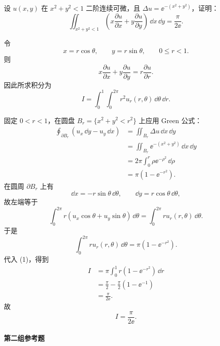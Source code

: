 \begin{xreferenceproblem}[7]
设 $u(x,y)$ 在 $x^2+y^2<1$ 二阶连续可微，且 $\Delta u=\ee^{-(x^2+y^2)}$，证明：
\[
  \iint_{x^2+y^2<1}\left(x\frac{\partial u}{\partial x}+y\frac{\partial u}{\partial y}\right)\,\dd x\,\dd y
  =\frac{\pi}{2\ee}.
\]
\end{xreferenceproblem}
\begin{xsolution}
令
\[
  x=r\cos\theta,
  \qquad
  y=r\sin\theta,
  \qquad
  0\le r<1.
\]
则
\[
  x\frac{\partial u}{\partial x}
  +y\frac{\partial u}{\partial y}
  =r\frac{\partial u}{\partial r}.
\]
因此所求积分为
\begin{equation}
  I=\int_0^1\int_0^{2\pi}r^2u_r(r,\theta)\,\dd\theta\,\dd r.
  \tag{1}
\end{equation}

固定 $0<r<1$，在圆盘 $B_r=\{x^2+y^2<r^2\}$ 上应用 Green 公式：
\begin{align*}
  \oint_{\partial B_r}
  \left(u_x\,\dd y-u_y\,\dd x\right)
  &=\iint_{B_r}\Delta u\,\dd x\,\dd y\\
  &=\iint_{B_r}\ee^{-(x^2+y^2)}\,\dd x\,\dd y\\
  &=2\pi\int_0^r\rho\ee^{-\rho^2}\,\dd\rho\\
  &=\pi(1-\ee^{-r^2}).
\end{align*}
在圆周 $\partial B_r$ 上有
\[
  \dd x=-r\sin\theta\,\dd\theta,
  \qquad
  \dd y=r\cos\theta\,\dd\theta,
\]
故左端等于
\[
  \int_0^{2\pi}r
  \left(u_x\cos\theta+u_y\sin\theta\right)\,\dd\theta
  =\int_0^{2\pi}r u_r(r,\theta)\,\dd\theta.
\]
于是
\[
  \int_0^{2\pi}r u_r(r,\theta)\,\dd\theta
  =\pi(1-\ee^{-r^2}).
\]
代入 (1)，得到
\begin{align*}
  I
  &=\pi\int_0^1 r(1-\ee^{-r^2})\,\dd r\\
  &=\frac{\pi}{2}-\frac{\pi}{2}(1-\ee^{-1})\\
  &=\frac{\pi}{2\ee}.
\end{align*}
故
\[
  \boxed{I=\frac{\pi}{2\ee}}.
\]
\end{xsolution}


\paragraph{第二组参考题}

